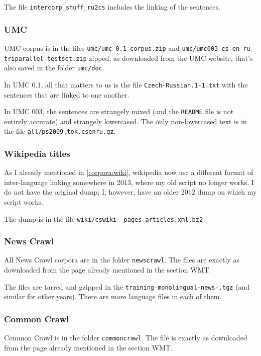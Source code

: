 The file \texttt{intercorp\_shuff\_ru2cs} includes the linking of the sentences.

\subsubsection{UMC}
UMC corpus is in the files \texttt{umc/umc-0.1-corpus.zip} and \texttt{umc/\allowbreak umc003-\allowbreak cs-\allowbreak en-\allowbreak ru-\allowbreak triparallel-testset.zip} zipped, as downloaded from the UMC website, that's also saved in the folder \texttt{umc/doc}.

In UMC 0.1, all that matters to us is the file \texttt{Czech-Russian.1-1.txt} with the sentences that are linked to one another.

In UMC 003, the sentences are strangely mixed (and the \texttt{README} file is not entirely accurate) and strangely lowercased. The only non-lowercased text is in the file \texttt{all/ps2009.tok.csenru.gz}.

\subsubsection{Wikipedia titles}
As I already mentioned in \ref{corpora:wiki}, wikipedia now use a different format of inter-language linking somewhere in 2013, where my old script no longer works. I do not have the original dump; I, however, have an older 2012 dump on which my script works.

The dump is in the file \texttt{wiki/cswiki--\allowbreak pages-\allowbreak articles.xml.bz2}

\subsubsection{News Crawl}
All News Crawl corpora are in the folder \texttt{newscrawl}. The files are exactly as downloaded from the page already mentioned in the section WMT.

The files are tarred and gzipped in the \texttt{training-\allowbreak monolingual-\allowbreak news-.\allowbreak tgz} (and similar for other years). There are more language files in each of them.

\subsubsection{Common Crawl}
Common Crawl is in the folder \texttt{commoncrawl}. The file is exactly as downloaded from the page already mentioned in the section WMT.

